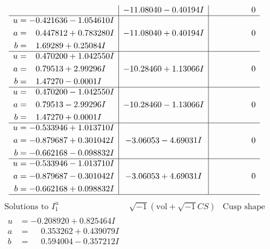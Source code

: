 \documentclass[1p]{elsarticle_modified}
\theoremstyle{definition}
\newcommand{\I}{\sqrt{-1}}
\begin{document}
$$\begin{array}{c|c|c}
 & -11.08040 - 0.40194 I & \phantom{-0.000000 } 0 \\ \hline\begin{aligned}
u &= -0.421636 - 1.054610 I \\
a &= \phantom{-}0.447812 + 0.783280 I \\
b &= \phantom{-}1.69289 + 0.25084 I\end{aligned}
 & -11.08040 + 0.40194 I & \phantom{-0.000000 } 0 \\ \hline\begin{aligned}
u &= \phantom{-}0.470200 + 1.042550 I \\
a &= \phantom{-}0.79513 + 2.99296 I \\
b &= \phantom{-}1.47270 - 0.0001 I\end{aligned}
 & -10.28460 + 1.13066 I & \phantom{-0.000000 } 0 \\ \hline\begin{aligned}
u &= \phantom{-}0.470200 - 1.042550 I \\
a &= \phantom{-}0.79513 - 2.99296 I \\
b &= \phantom{-}1.47270 + 0.0001 I\end{aligned}
 & -10.28460 - 1.13066 I & \phantom{-0.000000 } 0 \\ \hline\begin{aligned}
u &= -0.533946 + 1.013710 I \\
a &= -0.879687 + 0.301042 I \\
b &= -0.662168 - 0.098832 I\end{aligned}
 & -3.06053 - 4.69031 I & \phantom{-0.000000 } 0 \\ \hline\begin{aligned}
u &= -0.533946 - 1.013710 I \\
a &= -0.879687 - 0.301042 I \\
b &= -0.662168 + 0.098832 I\end{aligned}
 & -3.06053 + 4.69031 I & \phantom{-0.000000 } 0\\
 \hline 
 \end{array}$$\newpage$$\begin{array}{c|c|c}  
\text{Solutions to }I^u_{1}& \I (\text{vol} + \sqrt{-1}CS) & \text{Cusp shape}\\
 \hline 
\begin{aligned}
u &= -0.208920 + 0.825464 I \\
a &= \phantom{-}0.353262 + 0.439079 I \\
b &= \phantom{-}0.594004 - 0.357212 I\end{aligned}

\end{array}$$
\end{document}
